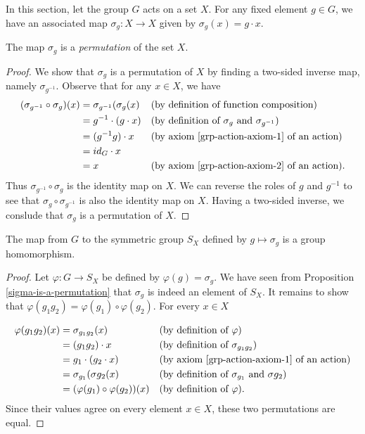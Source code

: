 In this section, let the group $G$ acts on a set $X$.  For any fixed element $g \in G$, we have an associated map $\sigma_g : X \to X$ given by $\sigma_g (x) = g \cdot x$.
\begin{prop}\label{sigma-is-a-permutation}
The map $\sigma_g$ is a \textit{permutation} of the set $X$.
\end{prop}
\begin{proof}
We show that $\sigma_g$ is a permutation of $X$ by finding a two-sided inverse map, namely $\sigma_{g^{-1}}$. Observe that for any $x \in X$, we have
\begin{align*}
(\sigma_{g^{-1}} \circ \sigma_g) (x) &= \sigma_{g^{-1}} ( \sigma_g (x) && \text{(by definition of function composition)} \\
					&= g^{-1} \cdot (g \cdot x) && \text{(by definition of $\sigma_g$ and $\sigma_{g^{-1}}$)} \\
					&= (g^{-1}g) \cdot x &&\text{(by axiom \ref{grp-action-axiom-1} of an action)} \\
					&= id_G \cdot x \\
					&= x &&\text{(by axiom \ref{grp-action-axiom-2} of an action)}.
\end{align*}
Thus $\sigma_{g^{-1}} \circ \sigma_g$ is the identity map on $X$. We can reverse the roles of $g$ and $g^{-1}$ to see that $\sigma_g \circ \sigma_{g^{-1}}$ is also the identity map on $X$.  Having a two-sided inverse, we conslude that $\sigma_g$ is a permutation of $X$.
\end{proof}

\begin{prop}
The map from $G$ to the symmetric group $S_X$ defined by $g \mapsto \sigma_g$ is a group homomorphism.
\end{prop}
\begin{proof}
Let $\varphi : G \to S_X$ be defined by $\varphi (g) = \sigma_g$.  We have seen from Proposition \ref{sigma-is-a-permutation} that $\sigma_g$ is indeed an element of $S_X$.  It remains to show that $\varphi(g_1 g_2) = \varphi(g_1) \circ \varphi(g_2)$. For every $x \in X$ 

\begin{align*}
\varphi(g_1 g_2)(x) &= \sigma_{g_1 g_2} (x) && \text{(by definition of $\varphi$)} \\
			&= (g_1 g_2) \cdot x && \text{(by definition of $\sigma_{g_1 g_2}$)} \\
			&= g_1 \cdot (g_2 \cdot x) && \text{(by axiom \ref{grp-action-axiom-1} of an action)} \\
			&= \sigma_{g_1} ( \sigma{g_2} (x) && \text{(by definition of $\sigma_{g_1}$ and  $\sigma{g_2}$)} \\
			&= (\varphi(g_1) \circ \varphi(g_2)) (x) && \text{(by definition of $\varphi$)}.
\end{align*}
Since their values agree on every element $x \in X$, these two permutations are equal.
\end{proof}


